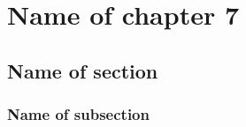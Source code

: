 

\graphicspath{{7/figures/}} %


\chapter{\label{ch7}Name of chapter 7} %

\section{\label{7:1}Name of section}

\subsection{\label{7:1:1}Name of subsection}




